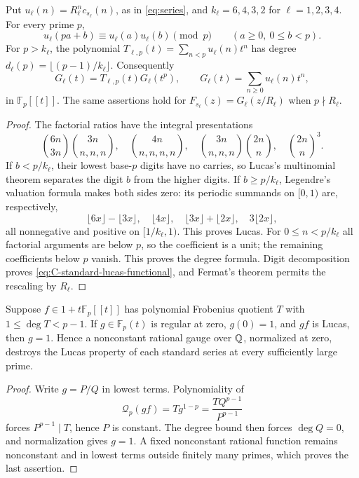 \begin{proposition}
\label{prop:C-standard-lucas}
Put $u_\ell(n)=R_\ell^n c_{s_\ell}(n)$, as in \eqref{eq:series}, and
$k_\ell=6,4,3,2$ for $\ell=1,2,3,4$. For every prime $p$,
\[
 u_\ell(pa+b)\equiv u_\ell(a)u_\ell(b)\pmod p
 \qquad(a\ge0,\ 0\le b<p).
\]
For $p>k_\ell$, the polynomial
$T_{\ell,p}(t)=\sum_{n<p}u_\ell(n)t^n$ has degree
$d_\ell(p)=\lfloor(p-1)/k_\ell\rfloor$. Consequently
\begin{equation}\label{eq:C-standard-lucas-functional}
 G_\ell(t)=T_{\ell,p}(t)G_\ell(t^p),\qquad
 G_\ell(t)=\sum_{n\ge0}u_\ell(n)t^n,
\end{equation}
in $\mathbb F_p[[t]]$. The same assertions hold for
$F_{s_\ell}(z)=G_\ell(z/R_\ell)$ when $p\nmid R_\ell$.
\end{proposition}
\begin{proof}
The factorial ratios have the integral presentations
\[
 \binom{6n}{3n}\binom{3n}{n,n,n},\quad
 \binom{4n}{n,n,n,n},\quad
 \binom{3n}{n,n,n}\binom{2n}{n},\quad
 \binom{2n}{n}^{\!3}.
\]
If $b<p/k_\ell$, their lowest base-$p$ digits have no carries, so
Lucas's multinomial theorem separates the digit $b$ from the higher
digits. If $b\ge p/k_\ell$, Legendre's valuation formula makes both
sides zero: its periodic summands on $[0,1)$ are, respectively,
\[
 \lfloor6x\rfloor-\lfloor3x\rfloor,\quad \lfloor4x\rfloor,
 \quad\lfloor3x\rfloor+\lfloor2x\rfloor,\quad3\lfloor2x\rfloor,
\]
all nonnegative and positive on $[1/k_\ell,1)$. This proves Lucas.
For $0\le n<p/k_\ell$ all factorial arguments are below $p$,
so the coefficient is a unit; the remaining coefficients below $p$
vanish. This proves the degree formula. Digit decomposition proves
\eqref{eq:C-standard-lucas-functional}, and Fermat's theorem permits
the rescaling by $R_\ell$.
\end{proof}

\begin{proposition}
\label{prop:C-lucas-rational-rigidity}
Suppose $f\in1+t\mathbb F_p[[t]]$ has polynomial Frobenius quotient
$T$ with $1\le\deg T<p-1$. If $g\in\mathbb F_p(t)$ is regular at
zero, $g(0)=1$, and $gf$ is Lucas, then $g=1$.
Hence a nonconstant rational gauge over $\mathbb Q$, normalized at zero,
destroys the Lucas property of each standard series at every
sufficiently large prime.
\end{proposition}
\begin{proof}
Write $g=P/Q$ in lowest terms. Polynomiality of
\begin{equation}\label{eq:C-lucas-gauge-covariance}
 \mathcal Q_p(gf)=Tg^{1-p}=\frac{TQ^{p-1}}{P^{p-1}}
\end{equation}
forces $P^{p-1}\mid T$, hence $P$ is constant. The degree bound
then forces $\deg Q=0$, and normalization gives $g=1$.
A fixed nonconstant rational function remains nonconstant and in
lowest terms outside finitely many primes, which proves the last
assertion.
\end{proof}

